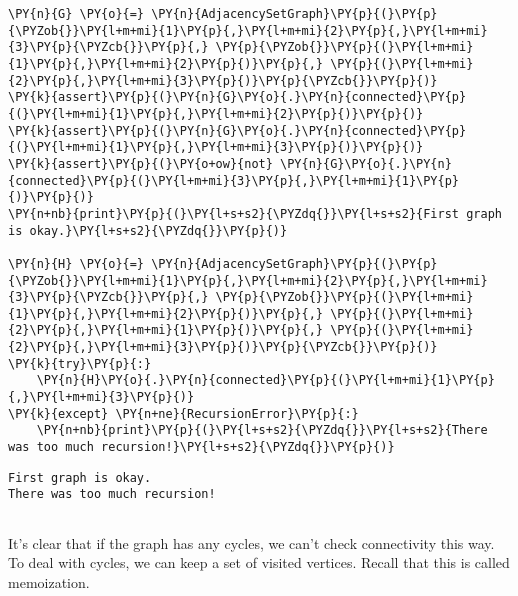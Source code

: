 \begin{Verbatim}[commandchars=\\\{\}]
\PY{n}{G} \PY{o}{=} \PY{n}{AdjacencySetGraph}\PY{p}{(}\PY{p}{\PYZob{}}\PY{l+m+mi}{1}\PY{p}{,}\PY{l+m+mi}{2}\PY{p}{,}\PY{l+m+mi}{3}\PY{p}{\PYZcb{}}\PY{p}{,} \PY{p}{\PYZob{}}\PY{p}{(}\PY{l+m+mi}{1}\PY{p}{,}\PY{l+m+mi}{2}\PY{p}{)}\PY{p}{,} \PY{p}{(}\PY{l+m+mi}{2}\PY{p}{,}\PY{l+m+mi}{3}\PY{p}{)}\PY{p}{\PYZcb{}}\PY{p}{)}
\PY{k}{assert}\PY{p}{(}\PY{n}{G}\PY{o}{.}\PY{n}{connected}\PY{p}{(}\PY{l+m+mi}{1}\PY{p}{,}\PY{l+m+mi}{2}\PY{p}{)}\PY{p}{)}
\PY{k}{assert}\PY{p}{(}\PY{n}{G}\PY{o}{.}\PY{n}{connected}\PY{p}{(}\PY{l+m+mi}{1}\PY{p}{,}\PY{l+m+mi}{3}\PY{p}{)}\PY{p}{)}
\PY{k}{assert}\PY{p}{(}\PY{o+ow}{not} \PY{n}{G}\PY{o}{.}\PY{n}{connected}\PY{p}{(}\PY{l+m+mi}{3}\PY{p}{,}\PY{l+m+mi}{1}\PY{p}{)}\PY{p}{)}
\PY{n+nb}{print}\PY{p}{(}\PY{l+s+s2}{\PYZdq{}}\PY{l+s+s2}{First graph is okay.}\PY{l+s+s2}{\PYZdq{}}\PY{p}{)}

\PY{n}{H} \PY{o}{=} \PY{n}{AdjacencySetGraph}\PY{p}{(}\PY{p}{\PYZob{}}\PY{l+m+mi}{1}\PY{p}{,}\PY{l+m+mi}{2}\PY{p}{,}\PY{l+m+mi}{3}\PY{p}{\PYZcb{}}\PY{p}{,} \PY{p}{\PYZob{}}\PY{p}{(}\PY{l+m+mi}{1}\PY{p}{,}\PY{l+m+mi}{2}\PY{p}{)}\PY{p}{,} \PY{p}{(}\PY{l+m+mi}{2}\PY{p}{,}\PY{l+m+mi}{1}\PY{p}{)}\PY{p}{,} \PY{p}{(}\PY{l+m+mi}{2}\PY{p}{,}\PY{l+m+mi}{3}\PY{p}{)}\PY{p}{\PYZcb{}}\PY{p}{)}
\PY{k}{try}\PY{p}{:}
    \PY{n}{H}\PY{o}{.}\PY{n}{connected}\PY{p}{(}\PY{l+m+mi}{1}\PY{p}{,}\PY{l+m+mi}{3}\PY{p}{)}
\PY{k}{except} \PY{n+ne}{RecursionError}\PY{p}{:}
    \PY{n+nb}{print}\PY{p}{(}\PY{l+s+s2}{\PYZdq{}}\PY{l+s+s2}{There was too much recursion!}\PY{l+s+s2}{\PYZdq{}}\PY{p}{)}
\end{Verbatim}

\begin{Verbatim}
First graph is okay.
There was too much recursion!


\end{Verbatim}


It's clear that if the graph has any cycles, we can't check connectivity this way.  To deal with cycles, we can keep a set of visited vertices.  Recall that this is called memoization.

